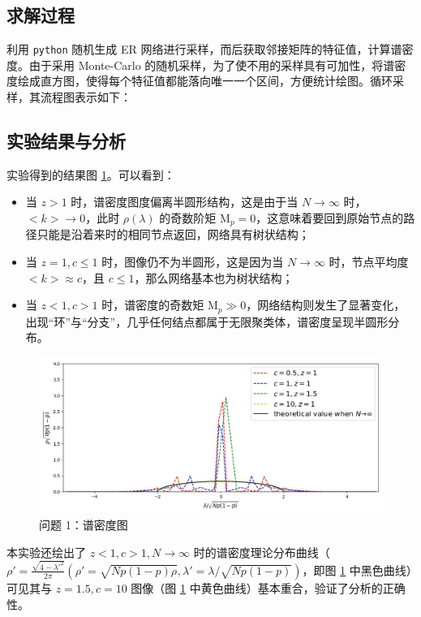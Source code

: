 \documentclass{article}
\begin{document}
\subsection{求解过程}

利用 \lstinline{python} 随机生成 ER 网络进行采样，而后获取邻接矩阵的特征值，计算谱密度。由于采用 Monte-Carlo 的随机采样，为了使不用的采样具有可加性，将谱密度绘成直方图，使得每个特征值都能落向唯一一个区间，方便统计绘图。循环采样，其流程图表示如下：

\begin{center}
\end{center}

\subsection{实验结果与分析}

实验得到的结果图 \ref{fig:task1}。可以看到：
\begin{itemize}
    \item 当 $z>1$ 时，谱密度图度偏离半圆形结构，这是由于当 $N\to\infty$ 时，$<k>\to 0$，此时 $\rho(\lambda)$ 的奇数阶矩 ${\mathrm{M}}_{p}=0$，这意味着要回到原始节点的路径只能是沿着来时的相同节点返回，网络具有树状结构；
    \item 当 $z=1,c\leq 1$ 时，图像仍不为半圆形，这是因为当 $N\to\infty$ 时，节点平均度 $<k>\approx c$，且 $c\leq 1$，那么网络基本也为树状结构；
    \item 当 $z<1,c>1$ 时，谱密度的奇数矩 ${\mathrm{M}}_{p} \gg 0$，网络结构则发生了显著变化，出现``环''与``分支''，几乎任何结点都属于无限聚类体，谱密度呈现半圆形分布。
\end{itemize}

\begin{figure}[ht]
    \label{fig:task1}
    \centering 
    \includegraphics[width=.7\textwidth]{../task1.jpg}
    \caption{问题 1：谱密度图}
\end{figure}

本实验还绘出了 $z<1,c>1,N\to\infty$ 时的谱密度理论分布曲线（$\rho'=\frac{\sqrt{4-\lambda'^2}}{2\pi}(\rho'=\sqrt{Np(1-p)\rho}, \lambda'=\lambda/\sqrt{Np(1-p)})$，即图 \ref{fig:task1} 中黑色曲线）可见其与 $z=1.5,c=10$ 图像（图 \ref{fig:task1} 中黄色曲线）基本重合，验证了分析的正确性。
\end{document}
